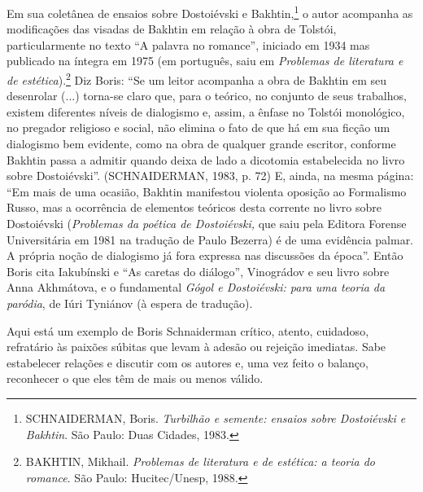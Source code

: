 Em sua coletânea de ensaios sobre Dostoiévski e Bakhtin,\footnote{SCHNAIDERMAN,
  Boris. \emph{Turbilhão e semente: ensaios sobre Dostoiévski e
  Bakhtin}. São Paulo: Duas Cidades, 1983.} o autor acompanha as
modificações das visadas de Bakhtin em relação à obra de Tolstói,
particularmente no texto ``A palavra no romance'', iniciado em 1934 mas
publicado na íntegra em 1975 (em português, saiu em \emph{Problemas de
literatura e de estética}).\footnote{BAKHTIN, Mikhail. \emph{Problemas
  de literatura e de estética: a teoria do romance}. São Paulo:
  Hucitec/Unesp, 1988.} Diz Boris: ``Se um leitor acompanha a obra de
Bakhtin em seu desenrolar (...) torna-se claro que, para o teórico, no
conjunto de seus trabalhos, existem diferentes níveis de dialogismo e,
assim, a ênfase no Tolstói monológico, no pregador religioso e social,
não elimina o fato de que há em sua ficção um dialogismo bem evidente,
como na obra de qualquer grande escritor, conforme Bakhtin passa a
admitir quando deixa de lado a dicotomia estabelecida no livro sobre
Dostoiévski''. (SCHNAIDERMAN, 1983, p. 72) E, ainda, na mesma página:
``Em mais de uma ocasião, Bakhtin manifestou violenta oposição ao
Formalismo Russo, mas a ocorrência de elementos teóricos desta corrente
no livro sobre Dostoiévski (\emph{Problemas da poética de Dostoiévski,}
que saiu pela Editora Forense Universitária em 1981 na tradução de Paulo
Bezerra) é de uma evidência palmar. A própria noção de dialogismo já
fora expressa nas discussões da época''. Então Boris cita Iakubínski e
``As caretas do diálogo'', Vinográdov e seu livro sobre Anna Akhmátova,
e o fundamental \emph{Gógol e Dostoiévski: para uma teoria da paródia},
de Iúri Tyniánov (à espera de tradução).

Aqui está um exemplo de Boris Schnaiderman crítico, atento, cuidadoso,
refratário às paixões súbitas que levam à adesão ou rejeição imediatas.
Sabe estabelecer relações e discutir com os autores e, uma vez feito o
balanço, reconhecer o que eles têm de mais ou menos válido.

